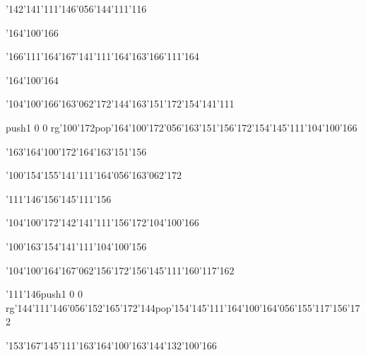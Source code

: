 \null\vfill\ipa\centerline{\enskip\enskip\enskip\enskip\enskip\enskip\enskip\enskip\enskip\enskip\enskip\char'142\char'141\char'111\char'146\char'056\char'144\char'111\char'116}\medskip\centerline{\enskip\enskip\enskip\enskip\enskip\enskip\enskip\enskip\enskip\enskip\enskip\enskip\char'164\char'100\char'166}\medskip\centerline{\enskip\enskip\char'166\char'111\char'164\enskip\enskip\char'167\char'141\char'111\char'164\char'163\enskip\enskip\enskip\enskip\char'166\char'111\char'164}\medskip\centerline{\enskip\enskip\enskip\enskip\enskip\enskip\enskip\enskip\enskip\enskip\enskip\char'164\char'100\char'164}\medskip\centerline{\enskip\char'104\char'100\char'166\enskip\char'163\char'062\char'172\char'144\enskip\enskip\char'163\char'151\char'172\enskip\char'154\char'141\char'111\enskip\enskip\enskip\enskip\enskip\enskip}\medskip\centerline{\enskip\pdfcolorstack\match push{1 0 0 rg}\char'100\char'172\pdfcolorstack\match pop{}\enskip\char'164\char'100\char'172\char'056\char'163\char'151\char'156\char'172\enskip\char'154\char'145\char'111\enskip\char'104\char'100\char'166\enskip\enskip\enskip\enskip\enskip}\medskip\centerline{\enskip\enskip\enskip\enskip\enskip\enskip\enskip\enskip\enskip\enskip\enskip\enskip\enskip\char'163\char'164\char'100\char'172\enskip\enskip\enskip\enskip\enskip\char'164\char'163\char'151\char'156}\medskip\vfill\footline{\hfil\tt\folio\hfil}\eject
\null\vfill\ipa\centerline{\enskip\enskip\enskip\enskip\enskip\enskip\enskip\enskip\char'100\char'154\enskip\char'155\char'141\char'111\char'164\char'056\char'163\char'062\char'172}\medskip\centerline{\enskip\char'111\char'146\enskip\char'156\char'145\char'111\char'156\enskip\enskip\enskip\enskip\enskip\enskip\enskip}\medskip\centerline{\enskip\enskip\char'104\char'100\char'172\enskip\enskip\char'142\char'141\char'111\char'156\char'172\enskip\enskip\enskip\enskip\char'104\char'100\char'166}\medskip\centerline{\enskip\char'100\char'163\enskip\char'154\char'141\char'111\enskip\enskip\enskip\enskip\char'104\char'100\char'156}\medskip\centerline{\enskip\char'104\char'100\char'164\enskip\char'167\char'062\char'156\char'172\enskip\enskip\enskip\enskip\enskip\enskip\char'156\char'145\char'111\enskip\enskip\enskip\char'160\char'117\char'162}\medskip\centerline{\enskip\char'111\char'146\enskip\pdfcolorstack\match push{1 0 0 rg}\char'144\char'111\char'146\char'056\char'152\char'165\char'172\char'144\pdfcolorstack\match pop{}\enskip\char'154\char'145\char'111\enskip\char'164\char'100\char'164\char'056\char'155\char'117\char'156\char'172}\medskip\centerline{\enskip\char'153\char'167\char'145\char'111\enskip\enskip\enskip\enskip\enskip\enskip\enskip\enskip\enskip\char'163\char'164\char'100\char'163\enskip\enskip\enskip\enskip\enskip\char'144\char'132\char'100\char'166}\medskip\vfill\footline{\hfil\tt\folio\hfil}\eject

